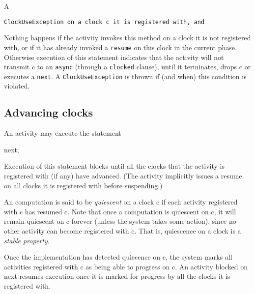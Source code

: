 \noindent A {\tt ClockUseException
\noindent on a clock {\tt c} it is registered with, and   

Nothing happens if the activity invokes this method on a clock it is
not registered with, or if it has already invoked a {\tt resume} on
this clock in the current phase.  Otherwise execution of this
statement indicates that the activity will not transmit {\cf c} to an
{\tt async} (through a {\tt clocked} clause), 
until it terminates, drops {\cf c} or executes a {\tt next}. 
A {\tt ClockUseException} is thrown if (and when) this condition is violated. 


\subsection{Advancing clocks}\label{sec:clock:next}
An activity may execute the statement
\begin{x10}
  next;
\end{x10}

\noindent 
Execution of this statement blocks until all the clocks that the
activity is registered with (if any) have advanced. (The activity
implicitly issues a {\cf resume} on all clocks it is registered
with before suspending.)

An \Xten{} computation is said to be {\em quiescent} on a clock {\cf
c} if each activity registered with {\cf c} has resumed {\cf c}.
Note that once a computation is quiescent on {\cf c}, it will remain
quiescent on {\cf c} forever (unless the system takes some action),
since no other activity can become registered with {\cf c}.  That is,
quiescence on a clock is a {\em stable property}.

Once the implementation has detected quiecence on {\cf c}, the system
marks all activities registered with {\cf c} as being able to progress
on {\cf c}. An activity blocked on {\cf next} resumes execution once
it is marked for progress by all the clocks it is registered with.

}
